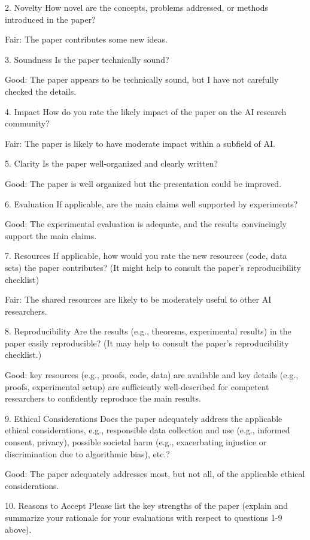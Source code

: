 \documentclass{article}
\begin{document}
2. {Novelty} How novel are the concepts, problems addressed, or methods introduced in the paper?

Fair: The paper contributes some new ideas.

3. {Soundness} Is the paper technically sound?

Good: The paper appears to be technically sound, but I have not carefully checked the details.

4. {Impact} How do you rate the likely impact of the paper on the AI research community?

Fair: The paper is likely to have moderate impact within a subfield of AI.

5. {Clarity} Is the paper well-organized and clearly written?

Good: The paper is well organized but the presentation could be improved.

6. {Evaluation} If applicable, are the main claims well supported by experiments?

Good: The experimental evaluation is adequate, and the results convincingly support the main claims.

7. {Resources} If applicable, how would you rate the new resources (code, data sets) the paper contributes? (It might help to consult the paper’s reproducibility checklist)

Fair: The shared resources are likely to be moderately useful to other AI researchers.

8. {Reproducibility} Are the results (e.g., theorems, experimental results) in the paper easily reproducible? (It may help to consult the paper’s reproducibility checklist.)

Good: key resources (e.g., proofs, code, data) are available and key details (e.g., proofs, experimental setup) are sufficiently well-described for competent researchers to confidently reproduce the main results.

9. {Ethical Considerations} Does the paper adequately address the applicable ethical considerations, e.g., responsible data collection and use (e.g., informed consent, privacy), possible societal harm (e.g., exacerbating injustice or discrimination due to algorithmic bias), etc.?

Good: The paper adequately addresses most, but not all, of the applicable ethical considerations.

10. {Reasons to Accept} Please list the key strengths of the paper (explain and summarize your rationale for your evaluations with respect to questions 1-9 above).
\end{document}
